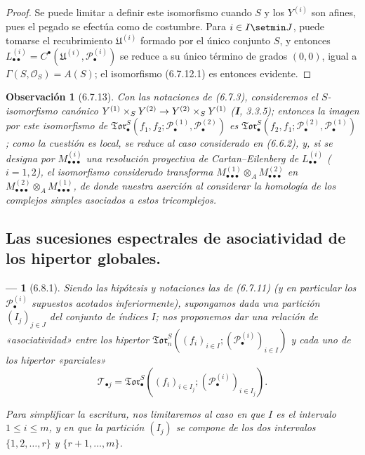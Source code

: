 \documentclass[10pt,oneside,openany]{book}
\theoremstyle{egaenv}\newtheorem*{env}{---}
\theoremstyle{egastatement}
\theoremstyle{egadescription}
\newtheorem*{remark}{Observación}
\newcommand{\oldpage}[2][]{\marginnote{\normalfont\scriptsize\textbf{#1}\,|\,#2}\ignorespaces}
\renewcommand{\leq}{\leqslant}
\renewcommand{\to}{\mathchoice{\longrightarrow}{\rightarrow}{\rightarrow}{\rightarrow}}
\begin{document}
\begin{proof}
Se puede limitar a definir este isomorfismo cuando $S$ y los $Y^{(i)}$ son
afines, pues el pegado se efectúa como de costumbre. Para $i\in I\setmin J$, puede
tomarse el recubrimiento $\mathfrak U^{(i)}$ formado por el único conjunto $S$,
y entonces
$L_{\bullet\bullet}^{(i)}=C^\bullet(\mathfrak U^{(i)},
\mathscr P_\bullet^{(i)})$ se reduce a su único término de grados $(0,0)$,
igual a $\Gamma(S,\mathscr O_S)=A(S)$; el isomorfismo (6.7.12.1) es entonces
evidente.
\end{proof}

\begin{remark}[6.7.13]
\label{III.6.7.13}
Con las notaciones de (6.7.3), consideremos el $S$-isomorfismo canónico
$Y^{(1)}\times_S Y^{(2)}\to Y^{(2)}\times_S Y^{(1)}$ (\textbf I, 3.3.5); entonces la
imagen por este isomorfismo de
$\mathfrak{Tor}_\bullet^S(f_1,f_2;
\mathscr P_\bullet^{(1)},\mathscr P_\bullet^{(2)})$ es
$\mathfrak{Tor}_\bullet^S(f_2,f_1;
\mathscr P_\bullet^{(2)},\mathscr P_\bullet^{(1)})$; como la cuestión es
local, se reduce al caso considerado en (6.6.2), y, si se designa por
$M_{\bullet\bullet\bullet}^{(i)}$ una resolución proyectiva de
Cartan--Eilenberg de $L_{\bullet\bullet}^{(i)}$ ($i=1,2$), el isomorfismo
considerado transforma
$M_{\bullet\bullet\bullet}^{(1)}\otimes_A
M_{\bullet\bullet\bullet}^{(2)}$ en
$M_{\bullet\bullet\bullet}^{(2)}\otimes_A
M_{\bullet\bullet\bullet}^{(1)}$, de donde nuestra aserción al considerar la homología de los complejos simples asociados a estos tricomplejos.
\end{remark}

\subsection{Las sucesiones espectrales de asociatividad de los hipertor globales.}

\begin{env}[6.8.1]
Siendo las hipótesis y notaciones las de (6.7.11) (y en particular los
$\mathscr P_\bullet^{(i)}$ supuestos \emph{acotados inferiormente}), supongamos
dada una partición $(I_j)_{j\in J}$ del conjunto de índices $I$; nos
proponemos dar una relación de «asociatividad» entre los hipertor
$\mathfrak{Tor}_n^S((f_i)_{i\in I};(\mathscr P_\bullet^{(i)})_{i\in I})$ y
cada uno de los hipertor «parciales»
\[
  \mathscr T_{\bullet j}
  =\mathfrak{Tor}_\bullet^S
  ((f_i)_{i\in I_j};(\mathscr P_\bullet^{(i)})_{i\in I_j}).
\]

\oldpage[III]{165}
Para simplificar la escritura, nos limitaremos al caso en que $I$ es
el intervalo $1\leq i\leq m$, y en que la partición $(I_j)$ se compone de los dos
intervalos $\{1,2,\ldots,r\}$ y $\{r+1,\ldots,m\}$.
\end{env}
\end{document}
